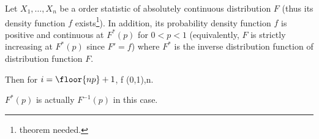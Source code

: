 \begin{theorem}\label{thm:asymptotic_distribution_central_order_statistic}
Let $X_1,\dots,X_n$ be a order statistic of absolutely continuous distribution $F$ (thus its density function $f$ exists\footnote{theorem needed.}). In addition, its probability density function $f$ is positive and continuous at $F^*(p)$ for $0<p<1$ (equivalently, $F$ is strictly increasing at $F^*(p)$ since $F'=f$) where $F^*$ is the inverse distribution function of distribution function $F$.

Then for $i = \floor{np}+1$,
\be
{}f   \sN(0,1),\qquad  {}n\to \infty.
\ee
\end{theorem}

\begin{remark}
$F^{*}(p)$ is actually $F^{-1}(p)$ in this case.
\end{remark}




